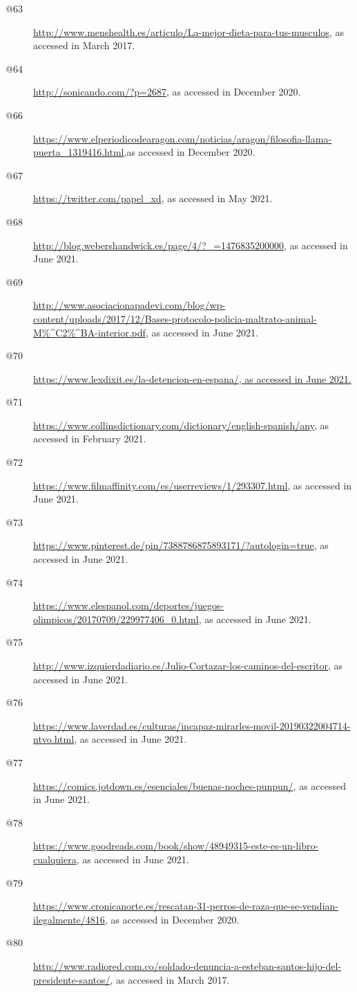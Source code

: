 \begin{flushleft}
\begin{description}
\item[@63] \url{http://www.menshealth.es/articulo/La-mejor-dieta-para-tus-musculos}, as accessed in March 2017.
\item[@64] \url{http://sonicando.com/?p=2687}, as accessed in December 2020.
\item[{{@66}}] { \url{https://www.elperiodicodearagon.com/noticias/aragon/filosofia-llama-puerta_1319416.html}{{,}}{as accessed in December 2020.}}
\item[{{@67}}] { \url{https://twitter.com/papel_xd}{, as accessed in May 2021.}}
\item[{{@68}}] { \url{http://blog.webershandwick.es/page/4/?_=1476835200000}{, as accessed in June 2021.}}
\item[{{@69}}] { \url{http://www.asociacionapadevi.com/blog/wp-content/uploads/2017/12/Bases-protocolo-policia-maltrato-animal-M\%^C2\%^BA-interior.pdf}{, as accessed in June 2021.}}
\item[{{@70}}] {\url{https://www.lexdixit.es/la-detencion-en-espana/, as accessed in June 2021.}}
\item[{{@71}}] { \url{https://www.collinsdictionary.com/dictionary/english-spanish/any}{, as accessed in February 2021.}}
\item[{{@72}}] { \url{https://www.filmaffinity.com/es/userreviews/1/293307.html}{, as accessed in June 2021.}}
\item[{{@73}}] { \url{https://www.pinterest.de/pin/7388786875893171/?autologin=true}{, as accessed in June 2021.}}
\item[{{@74}}] { \url{https://www.elespanol.com/deportes/juegos-olimpicos/20170709/229977406_0.html}{, as accessed in June 2021.}}
\item[{{@75}}] { \url{http://www.izquierdadiario.es/Julio-Cortazar-los-caminos-del-escritor}{, as accessed in June 2021.}}
\item[{{@76}}] { \url{https://www.laverdad.es/culturas/incapaz-mirarles-movil-20190322004714-ntvo.html}{, as accessed in June 2021.}}
\item[@77] \url{https://comics.jotdown.es/esenciales/buenas-noches-punpun/}, as accessed in June 2021.
\item[@78] \url{https://www.goodreads.com/book/show/48949315-este-es-un-libro-cualquiera}, as accessed in June 2021.
\item[{{@79}}] { \url{https://www.cronicanorte.es/rescatan-31-perros-de-raza-que-se-vendian-ilegalmente/4816}{, as accessed in December 2020.}}
\item[{{@80}}] { \url{http://www.radiored.com.co/soldado-denuncia-a-esteban-santos-hijo-del-presidente-santos/}{, as accessed in March 2017.}}

\end{description}
\end{flushleft}
